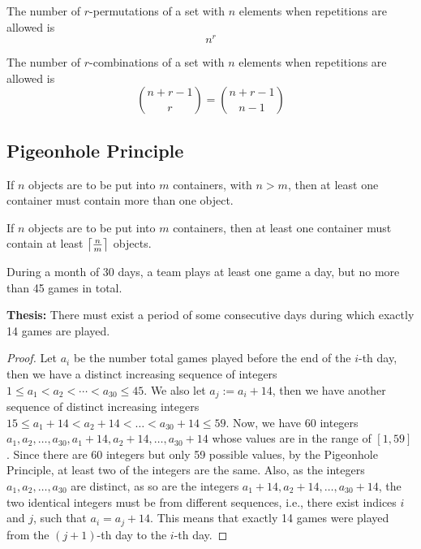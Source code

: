 \begin{theorem}
    The number of $r$-permutations of a set with $n$ elements when repetitions are allowed is
    \[
        n^r
    \]
\end{theorem}

\begin{theorem}
    The number of $r$-combinations of a set with $n$ elements when repetitions are allowed is
    \[
        \binom{n+r-1}{r} = \binom{n+r-1}{n-1}
    \]
    
\end{theorem}

\subsection{Pigeonhole Principle}

\begin{theorem}
    If $n$ objects are to be put into $m$ containers, with $n>m$, then at least one container
    must contain more than one object.    
\end{theorem}

\begin{corollary}
    If $n$ objects are to be put into $m$ containers, then at least one container must contain
    at least $\textstyle\left\lceil\frac{n}{m}\right\rceil$ objects.
\end{corollary}

\begin{example}
    During a month of 30 days, a team plays at least one game a day, but no more than 45 games in total.

    \textbf{Thesis:} There must exist a period of some consecutive days during which exactly 14 games are
    played.

    \begin{proof}
        Let $a_i$ be the number total games played before the end of the $i$-th day, then we have
        a distinct increasing sequence of integers $1\leq a_1<a_2<\cdots<a_{30}\leq 45$. We also let
        $a_j := a_i+14$, then we have another sequence of distinct increasing integers
        $15\leq a_1+14<a_2+14<\ldots<a_{30}+14\leq 59$. Now, we have 60 integers $a_1, a_2, \ldots, a_{30},
        a_1+14, a_2+14, \ldots, a_{30}+14$ whose values are in the range of $[1, 59]$. Since there are
        60 integers but only 59 possible values, by the Pigeonhole Principle, at least two of the integers
        are the same. Also, as the integers $a_1, a_2, \ldots, a_30$ are distinct, as so are the integers
        $a_1+14, a_2+14, \ldots, a_{30}+14$, the two identical integers must be from different sequences,
        i.e., there exist indices $i$ and $j$, such that $a_i = a_j + 14$. This means that exactly 14 games
        were played from the $(j+1)$-th day to the $i$-th day.
    \end{proof}
\end{example}